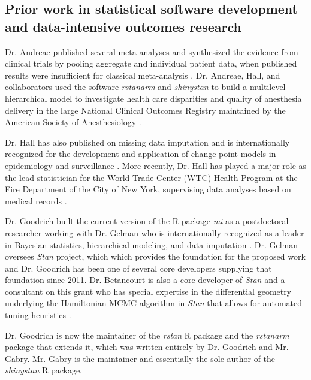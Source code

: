 \documentclass[11pt,notitlepage]{article}
\begin{document}
\subsection*{Prior work in statistical software development and data-intensive outcomes research}
 
Dr. Andreae published several meta-analyses and synthesized the evidence 
from clinical trials by pooling aggregate and individual patient data, when 
published results were insufficient for classical meta-analysis 
\cite{AndreaeJohnsonAbstract2013, Andreae2013, Andreae2015, Carter2015, Atchabahian2015}. Dr. Andreae, Hall, and 
collaborators used the software \textit{rstanarm} and \textit{shinystan} to build a multilevel 
hierarchical model to investigate health care disparities and quality of 
anesthesia delivery in the large National Clinical Outcomes Registry maintained 
by the American Society of Anesthesiology \cite{AndreaeWhite2015}. 

Dr. Hall has also published on missing data 
imputation \cite{Hall2009a, Wang_20029935, Wang_20029935} and is internationally 
recognized for the development and application of change point models in 
epidemiology and surveillance \cite{Hall2000, Hall2001, Hall2003bayesian, Hall2009, Hall2015}. 
More recently, Dr. Hall has played a major role as the lead statistician 
for the World Trade Center (WTC) Health Program at the Fire Department 
of the City of New York, supervising data analyses based on medical 
records \cite{Aldrich2010, Hall2015, Zeig-Owens2011}.

Dr. Goodrich built the current version of the R package \textit{mi} as a postdoctoral researcher working with
Dr. Gelman \cite{miCRAN} who is internationally recognized as a leader in Bayesian statistics, hierarchical 
modeling, and data imputation \cite{Gelman1998notasked, Gelman2001imputation, Hoffman2014, Gelman-Hill_2014}. 
Dr. Gelman oversees \textit{Stan}\cite{Stan_Software_2014} project, which which provides the foundation for the 
proposed work and Dr. Goodrich has been one of several core developers supplying that foundation since 2011.  
Dr. Betancourt is also a core developer of \textit{Stan} and a consultant on this grant who has special expertise in the differential 
geometry underlying the Hamiltonian MCMC algorithm in \textit{Stan} that allows for automated tuning heuristics
\cite{BetancourtGeometry2016}.

Dr. Goodrich is now the maintainer of the \textit{rstan} R package and the \textit{rstanarm} package that extends
it, which was written entirely by Dr. Goodrich and Mr. Gabry. Mr. Gabry is the maintainer and essentially the
sole author of the \textit{shinystan} R package.
\end{document}
